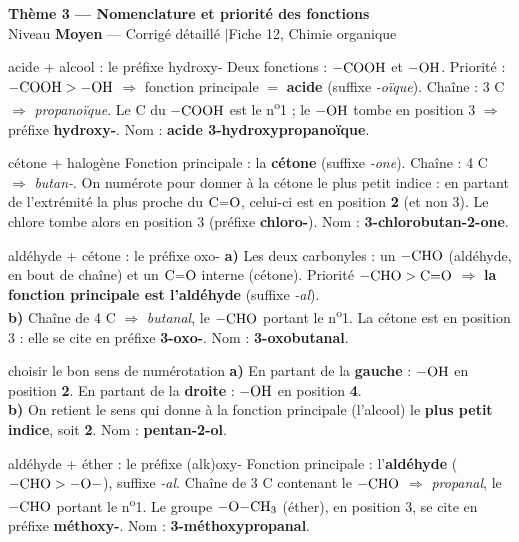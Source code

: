 \documentclass[11pt,a4paper]{article}
\newcommand{\rep}[1]{\textcolor{primarydark}{\textbf{#1}}}
\newcommand{\banner}[2]{%
\begin{tcolorbox}[enhanced,colback=excol,colframe=excol,arc=5pt,boxrule=0pt,
   left=5mm,right=5mm,top=2.5mm,bottom=2.5mm,coltext=white]
{\large\bfseries #1}\\[1pt]{\small #2}
\end{tcolorbox}\vspace{2pt}}
\begin{document}
\banner{Thème 3 — Nomenclature et priorité des fonctions}{Niveau \textbf{Moyen} — Corrigé détaillé \quad$\vert$\quad Fiche 12, Chimie organique}

\begin{corr}{acide + alcool : le préfixe hydroxy-}
Deux fonctions : $\ce{-COOH}$ et $\ce{-OH}$. Priorité : $\ce{-COOH} > \ce{-OH}$ $\Rightarrow$ fonction principale $=$ \rep{acide} (suffixe \textit{-oïque}). Chaîne : 3 C $\Rightarrow$ \emph{propanoïque}. Le C du $\ce{-COOH}$ est le n\textsuperscript{o}1 ; le $\ce{-OH}$ tombe en position 3 $\Rightarrow$ préfixe \textbf{hydroxy-}. Nom : \rep{acide 3-hydroxypropanoïque}.
\end{corr}

\begin{corr}{cétone + halogène}
Fonction principale : la \textbf{cétone} (suffixe \textit{-one}). Chaîne : 4 C $\Rightarrow$ \emph{butan-}. On numérote pour donner à la cétone le plus petit indice : en partant de l'extrémité la plus proche du $\ce{C=O}$, celui-ci est en position \textbf{2} (et non 3). Le chlore tombe alors en position 3 (préfixe \textbf{chloro-}). Nom : \rep{3-chlorobutan-2-one}.
\end{corr}

\begin{corr}{aldéhyde + cétone : le préfixe oxo-}
\textbf{a)} Les deux carbonyles : un $\ce{-CHO}$ (aldéhyde, en bout de chaîne) et un $\ce{C=O}$ interne (cétone). Priorité $\ce{-CHO} > \text{C=O}$ $\Rightarrow$ \rep{la fonction principale est l'aldéhyde} (suffixe \textit{-al}).\\
\textbf{b)} Chaîne de 4 C $\Rightarrow$ \emph{butanal}, le $\ce{-CHO}$ portant le n\textsuperscript{o}1. La cétone est en position 3 : elle se cite en préfixe \textbf{3-oxo-}. Nom : \rep{3-oxobutanal}.
\end{corr}

\begin{corr}{choisir le bon sens de numérotation}
\textbf{a)} En partant de la \textbf{gauche} : $\ce{-OH}$ en position \textbf{2}. En partant de la \textbf{droite} : $\ce{-OH}$ en position \textbf{4}.\\
\textbf{b)} On retient le sens qui donne à la fonction principale (l'alcool) le \rep{plus petit indice}, soit \textbf{2}. Nom : \rep{pentan-2-ol}.
\end{corr}

\begin{corr}{aldéhyde + éther : le préfixe (alk)oxy-}
Fonction principale : l'\textbf{aldéhyde} ($\ce{-CHO} > \ce{-O-}$), suffixe \textit{-al}. Chaîne de 3 C contenant le $\ce{-CHO}$ $\Rightarrow$ \emph{propanal}, le $\ce{-CHO}$ portant le n\textsuperscript{o}1. Le groupe $\ce{-O-CH3}$ (éther), en position 3, se cite en préfixe \textbf{méthoxy-}. Nom : \rep{3-méthoxypropanal}.
\end{corr}
\end{document}
